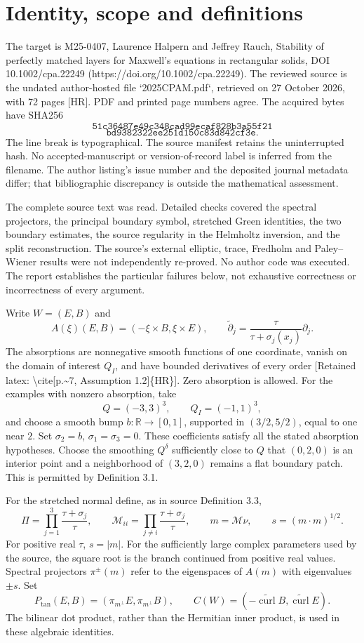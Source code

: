 \documentclass[10pt]{article}
\begin{document}
\section*{Identity, scope and definitions}
The target is M25-0407, Laurence Halpern and Jeffrey Rauch, Stability of perfectly matched layers for Maxwell’s equations in rectangular solids, DOI 10.1002/cpa.22249 (https://doi.org/10.1002/cpa.22249). The reviewed source is the undated author-hosted file `2025CPAM.pdf`, retrieved on 27 October 2026, with 72 pages [HR]. PDF and printed page numbers agree. The acquired bytes have SHA256 \[\texttt{51c36487e49c348cad99ecaf828b3a55f21}\] \[\texttt{bd9382322ee251d150c83d842cf3e}.\] The line break is typographical. The source manifest retains the uninterrupted hash. No accepted-manuscript or version-of-record label is inferred from the filename. The author listing’s issue number and the deposited journal metadata differ; that bibliographic discrepancy is outside the mathematical assessment.\par
The complete source text was read. Detailed checks covered the spectral projectors, the principal boundary symbol, stretched Green identities, the two boundary estimates, the source regularity in the Helmholtz inversion, and the split reconstruction. The source’s external elliptic, trace, Fredholm and Paley–Wiener results were not independently re-proved. No author code was executed. The report establishes the particular failures below, not exhaustive correctness or incorrectness of every argument.\par
Write \(W=(E,B)\) and \[A(\xi)(E,B)=(-\xi\times B,\xi\times E),\qquad
 \widetilde\partial_j=\frac{\tau}{\tau+\sigma_j(x_j)}\partial_j .\] The absorptions are nonnegative smooth functions of one coordinate, vanish on the domain of interest \(Q_I\), and have bounded derivatives of every order [Retained latex: \textbackslash{}cite[p.\textasciitilde{}7, Assumption 1.2]\{HR\}]. Zero absorption is allowed. For the examples with nonzero absorption, take \[Q=(-3,3)^3,\qquad Q_I=(-1,1)^3,\] and choose a smooth bump \(b:\mathbb R\to[0,1]\), supported in \((3/2,5/2)\), equal to one near \(2\). Set \(\sigma_2=b\), \(\sigma_1=\sigma_3=0\). These coefficients satisfy all the stated absorption hypotheses. Choose the smoothing \(Q^\delta\) sufficiently close to \(Q\) that \((0,2,0)\) is an interior point and a neighborhood of \((3,2,0)\) remains a flat boundary patch. This is permitted by Definition 3.1.\par
For the stretched normal define, as in source Definition 3.3, \[\Pi=\prod_{j=1}^3\frac{\tau+\sigma_j}{\tau},\qquad
 \mathcal M_{ii}=\prod_{j\ne i}\frac{\tau+\sigma_j}{\tau},
 \qquad m=\mathcal M\nu,\qquad s=(m\cdot m)^{1/2}.\] For positive real \(\tau\), \(s=|m|\). For the sufficiently large complex parameters used by the source, the square root is the branch continued from positive real values. Spectral projectors \(\pi^\pm(m)\) refer to the eigenspaces of \(A(m)\) with eigenvalues \(\pm s\). Set \[P_{\mathrm{tan}}(E,B)=(\pi_{m^\perp}E,\pi_{m^\perp}B),\qquad
 C(W)=(-\widetilde{\operatorname{curl}}B,\widetilde{\operatorname{curl}}E).\] The bilinear dot product, rather than the Hermitian inner product, is used in these algebraic identities.\par
\end{document}
